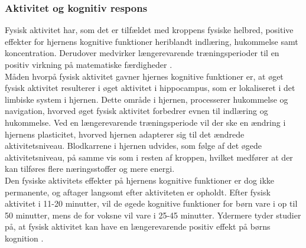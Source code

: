 \subsubsection{Aktivitet og kognitiv respons}
Fysisk aktivitet har, som det er tilfældet med kroppens fysiske helbred, positive effekter for hjernens kognitive funktioner heriblandt indlæring, hukommelse samt koncentration. %
Derudover medvirker længerevarende træningsperioder til en positiv virkning på matematiske færdigheder \citep{Bugge2015,Berchtold2010,Schmidt2015}.\\
Måden hvorpå fysisk aktivitet gavner hjernes kognitive funktioner er, at øget fysisk aktivitet resulterer i øget aktivitet i hippocampus, som er lokaliseret i det limbiske system i hjernen. Dette område i hjernen, processerer hukommelse og navigation, hvorved øget fysisk aktivitet forbedrer evnen til indlæring og hukommelse. Ved en længerevarende træningsperiode vil der ske en ændring i hjernens plasticitet, hvorved hjernen adapterer sig til det ændrede aktivitetsniveau. Blodkarrene i hjernen udvides, som følge af det øgede aktivitetsniveau, på samme vis som i resten af kroppen, hvilket medfører at der kan tilføres flere næringsstoffer og mere energi. \citep{Cotman2007}\\
Den fysiske aktivitets effekter på hjernens kognitive funktioner er dog ikke permanente, og aftager langsomt efter aktiviteten er opholdt. Efter fysisk aktivitet i 11-20 minutter, vil de øgede kognitive funktioner for børn vare i op til 50 minutter, mens de for voksne vil vare i 25-45 minutter. \citep{Cotman2007} Ydermere tyder studier på, at fysisk aktivitet kan have en længerevarende positiv effekt på børns kognition \citep{SibleyEtnier2003}.



